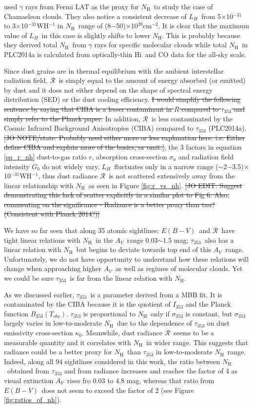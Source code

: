 \documentclass[preprint]{emulateapj}
\def\av{$A_{V}$}
\def\ebv{$E(B{-}V)$}
\def\hi{H{\sc i}}
\def\LH{$L_{H}$}
\def\NH{$N_\mathrm{H}$}
\def\s{s$^{-1}$}
\def\s353{$\sigma_{353}$}
\def\t353{$\tau_{353}$}
\def\rad{$\mathcal{R}$}
\begin{document}
\cite{PLC2015} used $\gamma$ rays from Fermi LAT as the proxy for \NH\ to study the case of Chamaeleon clouds. They also notice a consistent decrease of \LH\ from 5$\times$10$^{-31}$ to 3$\times$10$^{-31}$WH$^{-1}$ in \NH\ range of (8$-$50)$\times$10$^{20}$cm$^{-2}$. It is clear that the maximum value of \LH\ in this case is slightly shifts to lower \NH. This is probably because they derived total \NH\ from $\gamma$ rays for specific molecular clouds while total \NH\ in PLC2014a is calculated from optically-thin \hi\ and CO data for the all-sky scale.

Since dust grains are in thermal equilibrium with the ambient interstellar radiation field, \rad\ is simply equal to the amount of energy absorbed (or emitted) by dust and it does not either depend on the shape of spectral energy distribution (SED) or the dust cooling efficiency. \sout{I would simplify the following sentence by saying that CIBA is a lesser contaminant in $R$ compared to $\tau_{353}$ and simply refer to the Planck paper.} In addition, \rad\ is less contaminated by the Cosmic Infrared Background Anisotropies (CIBA) compared to \t353 (PLC2014a). \sout{[JO NOTE/state: Probably need either more or less explanation here. i.e. Either define CIBA and explain more of the basics, or omit.]}, the 3 factors in equation \ref{eq_r_nh} dust-to-gas ratio $r$, absorption cross-section $\sigma_{a}$ and radiation field intensity $G_{0}$ do not widely vary. \LH\ fluctuates only in a narrow range ($\sim$2$-$3.5)$\times$10$^{-31}$WH$^{-1}$, thus dust radiance \rad\ is not scattered extensively away from the linear relationship with \NH\ as seen in Figure \ref{fig:r_vs_nh}. \sout{[JO EDIT: Suggest demonstrating this lack of scatter explicitly in a similar plot to Fig 6. Also, commenting on the significance - Radiance is a better proxy than tau? (Consistent with Planck 2014?)]} 

We have so far seen that along 35 atomic sightlines: \ebv\ and \rad\ have tight linear relations with \NH\ in the \av\ range 0.03$\sim$1.5 mag; \t353\ also has a linear relation with \NH\, but begins to deviate towards top end of this \av\ range. Unfortunately, we do not have opportunity to understand how these relations will change when approaching higher \av\, as well as regimes of molecular clouds. Yet we could be sure \t353\ is far from the linear relation with \NH.

As we discussed earlier, \t353\ is a parameter derived from a MBB fit. It is contaminated by the CIBA because it is the quotient of $I_{353}$ and the Planck function $B_{353}(T_{obs})$. \t353 is proportional to \NH\ only if \s353 is constant, but \s353 largely varies in low-to-moderate \NH\ due to the dependence of \t353 on dust emissivity cross-section $\kappa_{0}$. Meanwhile, dust radiance \rad\ seems to be a measurable quantity and it correlates with \NH\ in wider range. This suggests that radiance could be a better proxy for \NH\ than \t353 in low-to-moderate \NH\ range. Indeed, along all 94 sightlines considered in this work, the ratio between \NH\ obtained from \t353 and from radiance increases and reaches the factor of 4 as visual extinction \av\ rises fro 0.03 to 4.8 mag, whereas that ratio from \ebv\ does not seem to exceed the factor of 2 (see Figure \ref{fig:ratios_of_nh}).
\end{document}
